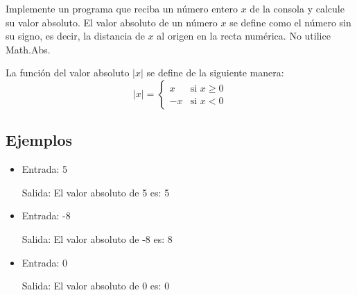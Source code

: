 Implemente un programa que reciba un número entero \( x \) de la consola y calcule su valor absoluto. El valor absoluto de un número \( x \) se define como el número sin su signo, es decir, la distancia de \( x \) al origen en la recta numérica. No utilice Math.Abs.

La función del valor absoluto \( |x| \) se define de la siguiente manera:
\[
|x| =
\begin{cases} 
x & \text{si } x \geq 0 \\
-x & \text{si } x < 0
\end{cases}
\]

\subsection*{Ejemplos}
\begin{itemize}
    \item Entrada: 5
    
    Salida: El valor absoluto de 5 es: 5

    \item Entrada: -8
    
    Salida: El valor absoluto de -8 es: 8

    \item Entrada: 0
    
    Salida: El valor absoluto de 0 es: 0
\end{itemize}
